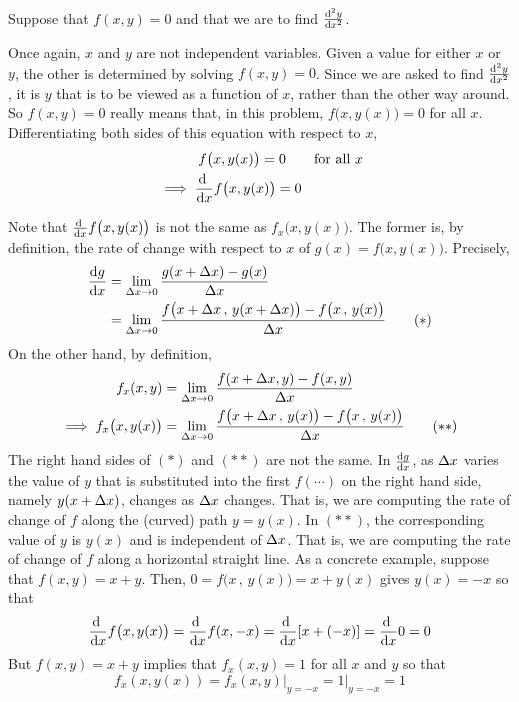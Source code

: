 \begin{eg}\label{eg:chainRuleE} 
Suppose that $f(x,y)=0$ and that we are to find $\difftwo{y}{x}$.
\smallskip

Once again, $x$ and $y$ are not independent variables. Given a value for
either $x$ or $y$, the other is determined by solving $f(x,y)=0$. Since
we are asked to find $\difftwo{y}{x}$, it is $y$ that is to be viewed
as a function of $x$, rather than the other way around. So $f(x,y)=0$ really
means that, in this problem, $f\big(x,y(x)\big)=0$ for all $x$. 
Differentiating both sides of this equation with respect to $x$,
\begin{align*}
&\phantom{\implies a} f\big(x,y(x)\big) = 0\qquad\text{for all }x\\
&\implies \diff{}{x}f\big(x,y(x)\big) = 0
\end{align*}

Note that $\diff{}{x}f\big(x,y(x)\big)$ is not the same as
$f_x\big(x,y(x)\big)$. The former is, by definition, the rate of change with 
respect to $x$ of $g(x)=f\big(x,y(x)\big)$. Precisely,
\begin{align}
\diff{g}{x}&=\lim_{\De x\rightarrow 0}\frac{g(x+\De x)-g(x)}{\De x}\notag\\
&=\lim_{\De x\rightarrow 0}\frac{f\big(x+\De x\,,\,y(x+\De x)\big)
-f\big(x\,,\,y(x)\big)}{\De x}
\tag{$*$}
\end{align}
On the other hand, by definition,
\begin{align}
f_x(x,y)&=\lim_{\Delta x\rightarrow 0}\frac{f(x+\Delta x,y)-f(x,y)}{\Delta x}\notag\\
\implies f_x\big(x,y(x)\big)
&=\lim_{\Delta x\rightarrow 0}\frac{f\big(x+\Delta x\,,\,y(x)\big)
                              -f\big(x\,,\,y(x)\big)}
{\Delta x}
\tag{$**$}
\end{align}
The right hand sides of $(*)$ and $(**)$ are not the same. 
In $\diff{g}{x}$, as $\Delta x$ varies the value of $y$ that is substituted 
into the  first $f(\cdots)$ on the right hand side, namely $y(x+\Delta x)$, 
changes as $\Delta x$ changes. That is, we are computing the rate of change 
of $f$ along the (curved) path $y=y(x)$.
 In $(**)$, the corresponding value of $y$ is $y(x)$ and is independent of 
$\Delta x$. That is, we are computing the rate of change of $f$ along a 
horizontal straight line. As a concrete example,
suppose that $f(x,y)=x+y$. Then, $0=f\big(x\,,\,y(x)\big)=x+y(x)$ gives
$y(x)=-x$ so that
\begin{equation*}
\diff{}{x}f\big(x,y(x)\big)
=\diff{}{x}f(x,-x)
=\diff{}{x}[x+(-x)]
=\diff{}{x}0 =0
\end{equation*}
But $f(x,y)=x+y$ implies that $f_x(x,y)=1$ for all $x$ and $y$ so that
\begin{equation*}
f_x(x,y(x))=f_x(x,y)\Big|_{y=-x}=1\Big|_{y=-x}=1
\end{equation*}


\end{eg}
